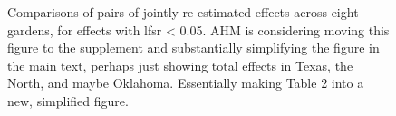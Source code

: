 \documentclass[
  9pt,
  twocolumn,
  twoside]{pnas-new}
\begin{document}
\begin{figure}


\caption{\label{fig-effects}Comparisons of pairs of jointly re-estimated
effects across eight gardens, for effects with lfsr \textless{} 0.05.
AHM is considering moving this figure to the supplement and
substantially simplifying the figure in the main text, perhaps just
showing total effects in Texas, the North, and maybe Oklahoma.
Essentially making Table 2 into a new, simplified figure.}

\end{figure}%
\end{document}
